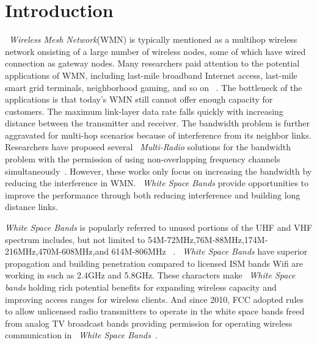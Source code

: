 \section{Introduction}
\label{sec:introduction}


~\emph{Wireless Mesh Network}(WMN) is typically mentioned as a multihop wireless network onsisting of a large number of wireless nodes, some of which have wired connection as gateway nodes. Many researchers paid attention to the potential applications of WMN, including last-mile broadband Internet access, last-mile smart grid terminals, neighborhood gaming, and so on ~\cite{bahl2004opportunities}.
The bottleneck of the applications is that today's WMN still cannot offer enough capacity for customers. The maximum link-layer data rate falls quickly with increasing distance between the transmitter and receiver. The bandwidth problem is further aggravated for multi-hop scenarios because of interference from its neighbor links. Researchers have proposed several ~\emph{Multi-Radio} solutions for the bandwidth problem with the permission of using non-overlapping frequency channels simultaneously~\cite{raniwala2004centralized,tang2005interference,si2010overview}.
However, these works only focus on increasing the bandwidth by reducing the interference in WMN. ~\emph{White Space Bands} provide opportunities to improve the performance through both reducing interference and building long distance links. 

\emph{White Space Bands} is popularly referred to unused portions of the UHF and VHF spectrum includes, but not limited to 54M-72MHz,76M-88MHz,174M-216MHz,470M-608MHz,and 614M-806MHz ~\cite{whitespacewiki}. 
~\emph{White Space Bands} have superior propagation and building penetration compared to licensed ISM bands Wifi are working in such as 2.4GHz and 5.8GHz. These characters make ~\emph{White Space bands} holding rich potential benefits for expanding wireless capacity and improving access ranges for wireless clients.
And since 2010, FCC adopted rules to allow unlicensed radio transmitters to operate in the white space bands freed from analog TV broadcast bands providing permission for operating wireless communication in ~\emph{White Space Bands}~\cite{fccwhitespace}. 


